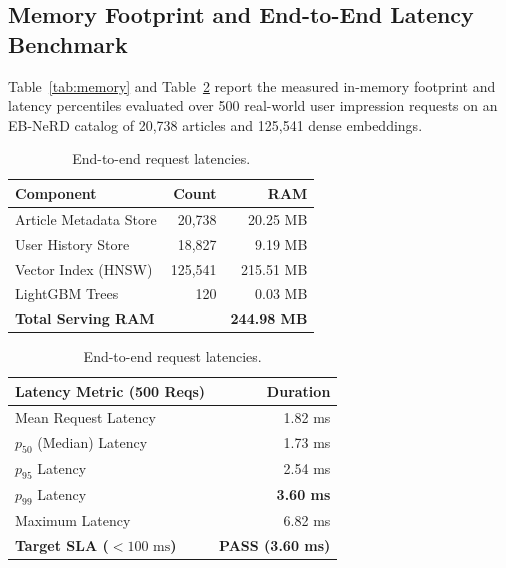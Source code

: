 \documentclass[11pt,a4paper]{article}
\begin{document}
\subsection{Memory Footprint and End-to-End Latency Benchmark}
Table~\ref{tab:memory} and Table~\ref{tab:latency} report the measured in-memory footprint and latency percentiles evaluated over 500 real-world user impression requests on an EB-NeRD catalog of 20,738 articles and 125,541 dense embeddings.

\begin{table}[htbp]
\centering
\small
\begin{minipage}[t]{0.46\textwidth}
\centering
\setlength{\tabcolsep}{2pt}
\begin{tabular}{lrr}
\toprule
\textbf{Component} & \textbf{Count} & \textbf{RAM} \\
\midrule
Article Metadata Store & 20,738 & 20.25 MB \\
User History Store     & 18,827 & 9.19 MB \\
Vector Index (HNSW)    & 125,541 & 215.51 MB \\
LightGBM Trees         & 120 & 0.03 MB \\
\midrule
\textbf{Total Serving RAM} & & \textbf{244.98 MB} \\
\bottomrule
\end{tabular}
\caption{Memory footprint breakdown.}
\label{tab:memory}
\end{minipage}\hfill
\begin{minipage}[t]{0.52\textwidth}
\centering
\setlength{\tabcolsep}{2pt}
\begin{tabular}{lr}
\toprule
\textbf{Latency Metric (500 Reqs)} & \textbf{Duration} \\
\midrule
Mean Request Latency & 1.82 ms \\
$p_{50}$ (Median) Latency & 1.73 ms \\
$p_{95}$ Latency & 2.54 ms \\
$p_{99}$ Latency & \textbf{3.60 ms} \\
Maximum Latency & 6.82 ms \\
\midrule
\textbf{Target SLA ($< 100\text{ ms}$)} & \textbf{PASS (3.60 ms)} \\
\bottomrule
\end{tabular}
\caption{End-to-end request latencies.}
\label{tab:latency}
\end{minipage}
\end{table}
\end{document}

